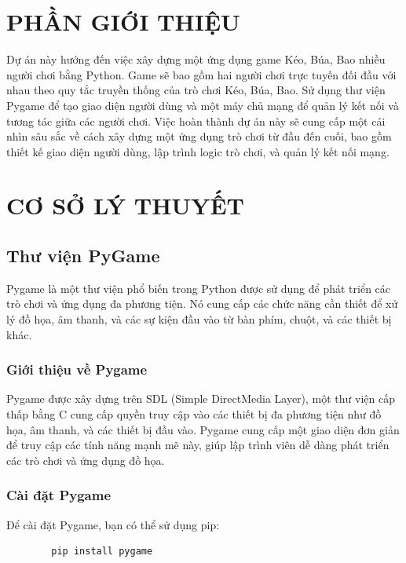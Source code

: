 \documentclass[a4paper]{article}
\begin{document}
\thispagestyle{empty}

\newpage
\tableofcontents
\newpage



\section{PHẦN GIỚI THIỆU}
Dự án này hướng đến việc xây dựng một ứng dụng game Kéo, Búa, Bao nhiều người chơi bằng Python. Game sẽ bao gồm hai người chơi trực tuyến đối đầu với nhau theo quy tắc truyền thống của trò chơi Kéo, Búa, Bao. Sử dụng thư viện Pygame để tạo giao diện người dùng và một máy chủ mạng để quản lý kết nối và tương tác giữa các người chơi.
Việc hoàn thành dự án này sẽ cung cấp một cái nhìn sâu sắc về cách xây dựng một ứng dụng trò chơi từ đầu đến cuối, bao gồm thiết kế giao diện người dùng, lập trình logic trò chơi, và quản lý kết nối mạng.



\newpage
\section{CƠ SỞ LÝ THUYẾT}
\subsection{Thư viện PyGame}
Pygame là một thư viện phổ biến trong Python được sử dụng để phát triển các trò chơi và ứng dụng đa phương tiện. Nó cung cấp các chức năng cần thiết để xử lý đồ họa, âm thanh, và các sự kiện đầu vào từ bàn phím, chuột, và các thiết bị khác.
\subsubsection{Giới thiệu về Pygame}
Pygame được xây dựng trên SDL (Simple DirectMedia Layer), một thư viện cấp thấp bằng C cung cấp quyền truy cập vào các thiết bị đa phương tiện như đồ họa, âm thanh, và các thiết bị đầu vào. Pygame cung cấp một giao diện đơn giản để truy cập các tính năng mạnh mẽ này, giúp lập trình viên dễ dàng phát triển các trò chơi và ứng dụng đồ họa.
\subsubsection{Cài đặt Pygame}
Để cài đặt Pygame, bạn có thể sử dụng pip:
\begin{mdframed}[hidealllines=true,backgroundcolor=magenta!10]
		\begin{lstlisting}
		pip install pygame
	\end{lstlisting}
	\end{mdframed}
\end{document}
